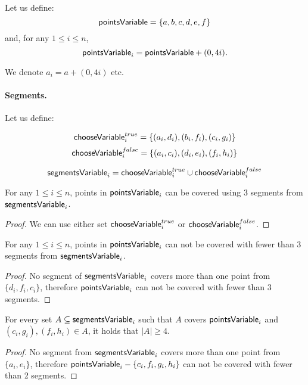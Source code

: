 Let us define:
$$\mathsf{pointsVariable} =  \{a, b, c, d, e, f\}$$
and, for any $1 \le i \le n$,
$$\mathsf{pointsVariable}_{i} = \mathsf{pointsVariable} + (0, 4i).$$

We denote $a_i = a + (0,4i)$ etc.

\paragraph{Segments.}

\newcommand{\xTrueSegment}[1]{(c_{#1}, g_{#1})}
\newcommand{\xFalseSegment}[1]{(f_{#1}, h_{#1})}
\newcommand{\orTrueSegment}[2]{(t_{#1, #2}, v_{#1, #2})}

Let us define:

$$\mathsf{chooseVariable}^{true}_{i} =\{ (a_i, d_i), (b_i, f_i), (c_i, g_i)\}$$
$$\mathsf{chooseVariable}^{false}_{i} = \{(a_i, c_i), (d_i, e_i), (f_i, h_i)\}$$

$$\mathsf{segmentsVariable}_{i} = \mathsf{chooseVariable}^{true}_{i} \cup \mathsf{chooseVariable}^{false}_{i}$$


\begin{lemma}
\label{choose_variables_solution}
For any $1 \le i \le n$, points in $\mathsf{pointsVariable}_{i}$
can be covered using 3 segments from $\mathsf{segmentsVariable}_{i}$.
\end{lemma}

\begin{proof}
We can use either set $\mathsf{chooseVariable}^{true}_{i}$ or $\mathsf{chooseVariable}^{false}_{i}$.
\end{proof}

\begin{lemma}
\label{choose_variables_no_less}
For any $1 \le i \le n$, points in $\mathsf{pointsVariable}_{i}$
can not be covered with fewer than 3 segments from $\mathsf{segmentsVariable}_{i}$.
\end{lemma}

\begin{proof}
No segment of $\mathsf{segmentsVariable}_{i}$ covers more than one point from
$\{d_i, f_i, c_i\}$, therefore $\mathsf{pointsVariable}_{i}$ can
not be covered with fewer than 3 segments.
\end{proof}

\begin{lemma}
\label{choose_variables_both}
For every set $A \subseteq \mathsf{segmentsVariable}_{i}$ such that $A$ covers $\mathsf{pointsVariable}_{i}$
and $\xTrueSegment{i}, \xFalseSegment{i} \in A$,
it holds that $|A| \ge 4$.
\end{lemma}
\begin{proof}
No segment from $\mathsf{segmentsVariable}_{i}$ covers more than one point from
$\{a_i, e_i\}$,
therefore 
$\mathsf{pointsVariable}_{i} - \{c_i, f_i, g_i, h_i\}$
can not be covered with fewer than 2 segments.
\end{proof}


